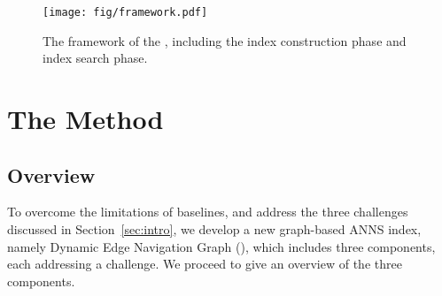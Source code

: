 \begin{figure*}[!t]
\begin{center}
\texttt{[image: fig/framework.pdf]}
\caption{The framework of the \method, including the index construction phase and index search phase.}
\label{fig:framework}
\end{center}
\end{figure*}

\section{The \method Method}
\label{sec:method}
\subsection{Overview}
\label{src:overview}


To overcome the limitations of baselines, and address the three challenges discussed in Section~\ref{sec:intro}, we develop a new graph-based ANNS index, namely Dynamic Edge Navigation Graph (\method), which includes three components, each addressing a challenge. We proceed to give an overview of the three components. 




